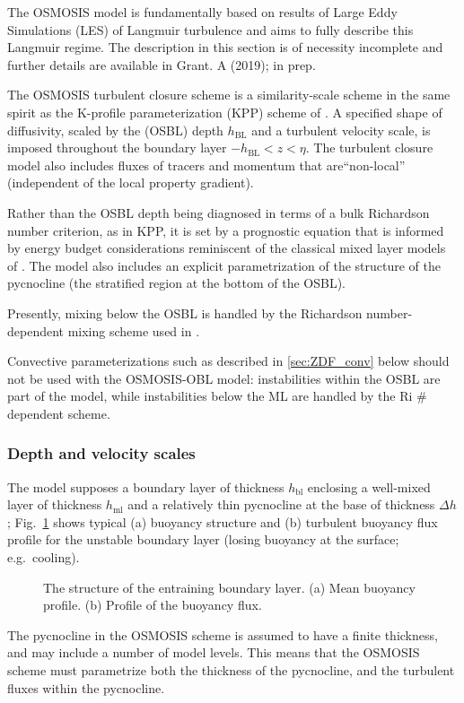 \documentclass[../main/NEMO_manual]{subfiles}
\begin{document}
The OSMOSIS model is fundamentally based on results of Large Eddy
Simulations (LES) of Langmuir turbulence and aims to fully describe
this Langmuir regime. The description in this section is of necessity incomplete and further details are available in Grant. A (2019); in prep.

The OSMOSIS turbulent closure scheme is a similarity-scale scheme in
the same spirit as the K-profile
parameterization (KPP) scheme of \citet{large.ea_RG97}.
A specified shape of diffusivity, scaled by the (OSBL) depth
$h_{\mathrm{BL}}$ and a turbulent velocity scale, is imposed throughout the
boundary layer
$-h_{\mathrm{BL}}<z<\eta$. The turbulent closure model
also includes fluxes of tracers and momentum that are``non-local'' (independent of the local property gradient).

Rather than the OSBL
depth being diagnosed in terms of a bulk Richardson number criterion,
as in KPP, it is set by a prognostic equation that is informed by
energy budget considerations reminiscent of the classical mixed layer
models of \citet{kraus.turner_tellus67}.
The model also includes an explicit parametrization of the structure
of the pycnocline (the stratified region at the bottom of the OSBL).

Presently, mixing below the OSBL is handled by the Richardson
number-dependent mixing scheme used in \citet{large.ea_RG97}.

Convective parameterizations such as described in \ref{sec:ZDF_conv}
below should not be used with the OSMOSIS-OBL model: instabilities
within the OSBL are part of the model, while instabilities below the
ML are handled by the Ri \# dependent scheme.

\subsubsection{Depth and velocity scales}
The model supposes a boundary layer of thickness $h_{\mathrm{bl}}$ enclosing a well-mixed layer of thickness $h_{\mathrm{ml}}$ and a relatively thin pycnocline at the base of thickness $\Delta h$; Fig.~\ref{fig: OSBL_structure} shows typical (a) buoyancy structure and (b) turbulent buoyancy flux profile for the unstable boundary layer (losing buoyancy at the surface; e.g.\ cooling).
\begin{figure}[!t]
  \begin{center}
    \caption{
      \protect\label{fig: OSBL_structure}
     The structure of the entraining  boundary layer. (a) Mean buoyancy profile. (b) Profile of the buoyancy flux.
    }
  \end{center}
\end{figure}
The pycnocline in the OSMOSIS scheme is assumed to have a finite thickness, and may include a number of model levels. This means that the OSMOSIS scheme must parametrize both the thickness of the pycnocline, and the turbulent fluxes within the pycnocline.
\end{document}
